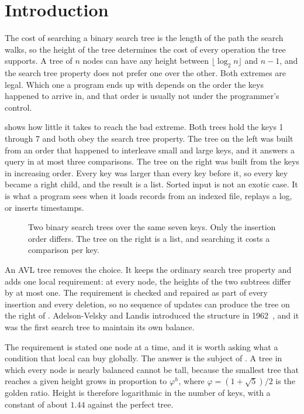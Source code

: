 \section{Introduction}
\label{sec:intro}

The cost of searching a binary search tree is the length of the path the search
walks, so the height of the tree determines the cost of every operation the tree
supports. A tree of $n$ nodes can have any height between $\lfloor \log_2 n
\rfloor$ and $n-1$, and the search tree property does not prefer one over the
other. Both extremes are legal. Which one a program ends up with depends on the
order the keys happened to arrive in, and that order is usually not under the
programmer's control.

 shows how little it takes to reach the bad extreme. Both
trees hold the keys 1 through 7 and both obey the search tree property. The tree
on the left was built from an order that happened to interleave small and large
keys, and it answers a query in at most three comparisons. The tree on the right
was built from the keys in increasing order. Every key was larger than every key
before it, so every key became a right child, and the result is a list. Sorted
input is not an exotic case. It is what a program sees when it loads records from
an indexed file, replays a log, or inserts timestamps.

\begin{figure}[t]
  \centering
  
  \caption{Two binary search trees over the same seven keys. Only the insertion
  order differs. The tree on the right is a list, and searching it costs a
  comparison per key.}
  \label{fig:degenerate}
\end{figure}

An AVL tree removes the choice. It keeps the ordinary search tree property and
adds one local requirement: at every node, the heights of the two subtrees differ
by at most one. The requirement is checked and repaired as part of every
insertion and every deletion, so no sequence of updates can produce the tree on
the right of . Adelson-Velsky and Landis introduced the
structure in 1962~\cite{avl1962}, and it was the first search tree to maintain
its own balance.

The requirement is stated one node at a time, and it is worth asking what a
condition that local can buy globally. The answer is the subject of
. A tree in which every node is nearly balanced cannot be tall,
because the smallest tree that reaches a given height grows in proportion to
$\varphi^h$, where $\varphi = (1+\sqrt{5})/2$ is the golden ratio. Height is
therefore logarithmic in the number of keys, with a constant of about $1.44$
against the perfect tree.

